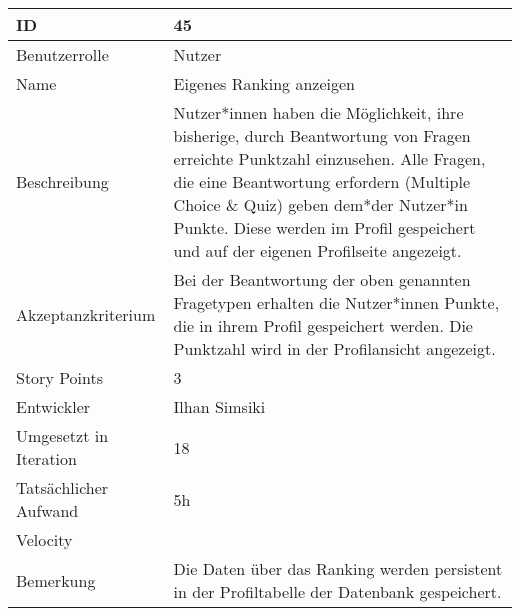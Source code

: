 \begin{tabularx}{\textwidth}{|p{}|X|}
	\hline
	ID & 45\\
	\hline
	Benutzerrolle & Nutzer\\
	\hline
	Name & Eigenes Ranking anzeigen\\
	\hline
	Beschreibung & Nutzer*innen haben die Möglichkeit, ihre bisherige, durch Beantwortung von Fragen erreichte Punktzahl einzusehen. Alle Fragen, die eine Beantwortung erfordern (Multiple Choice \& Quiz) geben dem*der Nutzer*in Punkte. Diese werden im Profil gespeichert und auf der eigenen Profilseite angezeigt.\\
	\hline
	Akzeptanzkriterium & Bei der Beantwortung der oben genannten Fragetypen erhalten die Nutzer*innen Punkte, die in ihrem Profil gespeichert werden. Die Punktzahl wird in der Profilansicht angezeigt.\\
	\hline
	Story Points & 3\\
	\hline
	Entwickler & Ilhan Simsiki\\
	\hline
	Umgesetzt in Iteration & 18\\
	\hline
	Tatsächlicher Aufwand & 5h\\
	\hline
	Velocity & \\
	\hline
	Bemerkung & Die Daten über das Ranking werden persistent in der Profiltabelle der Datenbank gespeichert.\\
	\hline
\end{tabularx}
\vspace{20pt}

